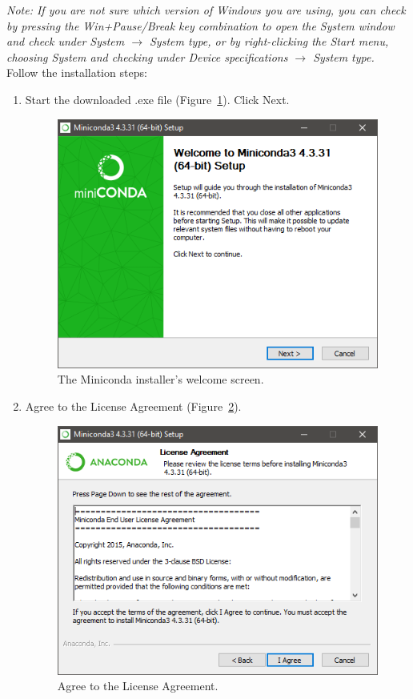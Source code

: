 \documentclass[11pt,a4paper]{article}
\newcommand{\note}[1]{\textit{Note: {#1}}}
\begin{document}
\note{If you are not sure which version of Windows you are using, you can check by pressing the Win+Pause/Break key combination to open the System window and check under System $\rightarrow$ System type, or by right-clicking the Start menu, choosing System and checking under Device specifications $\rightarrow$ System type.}\\


Follow the installation steps:
\begin{enumerate}

\item Start the downloaded .exe file (Figure~\ref{fig:miniconda_install_1}). Click Next.
	\begin{figure}[H]
	\centering
	\includegraphics[scale=0.8]{miniconda_install_1.PNG}
	\caption{The Miniconda installer's welcome screen.}
	\label{fig:miniconda_install_1}
	\end{figure}
	
\newpage	
\item Agree to the License Agreement (Figure~\ref{fig:miniconda_install_license}).
	\begin{figure}[H]
	\centering
	\includegraphics[scale=0.8]{miniconda_install_license.PNG}
	\caption{Agree to the License Agreement.}
	\label{fig:miniconda_install_license}
	\end{figure}



\end{enumerate}
\end{document}
